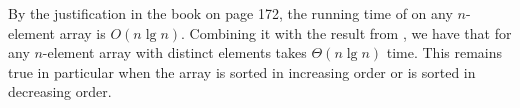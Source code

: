 By the justification in the book on page 172, the running time of  on any $n$-element array is $O(n\lg n)$.
Combining it with the result from , we have that for any $n$-element array with distinct elements  takes $\Theta(n\lg n)$ time.
This remains true in particular when the array is sorted in increasing order or is sorted in decreasing order.
